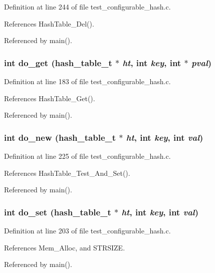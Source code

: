 Definition at line 244 of file test\_\-configurable\_\-hash.c.

References Hash\-Table\_\-Del().

Referenced by main().
\subsubsection{\setlength{\rightskip}{0pt plus 5cm}int do\_\-get (hash\_\-table\_\-t $\ast$ {\em ht}, int {\em key}, int $\ast$ {\em pval})}\label{test__configurable__hash_8c_a16}




Definition at line 183 of file test\_\-configurable\_\-hash.c.

References Hash\-Table\_\-Get().

Referenced by main().
\subsubsection{\setlength{\rightskip}{0pt plus 5cm}int do\_\-new (hash\_\-table\_\-t $\ast$ {\em ht}, int {\em key}, int {\em val})}\label{test__configurable__hash_8c_a18}




Definition at line 225 of file test\_\-configurable\_\-hash.c.

References Hash\-Table\_\-Test\_\-And\_\-Set().

Referenced by main().
\subsubsection{\setlength{\rightskip}{0pt plus 5cm}int do\_\-set (hash\_\-table\_\-t $\ast$ {\em ht}, int {\em key}, int {\em val})}\label{test__configurable__hash_8c_a17}




Definition at line 203 of file test\_\-configurable\_\-hash.c.

References Mem\_\-Alloc, and STRSIZE.

Referenced by main().
